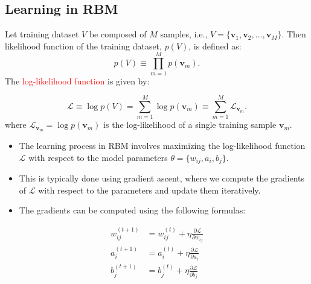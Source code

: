 \documentclass[10pt, a4paper]{article}
\begin{document}
\subsection{Learning in RBM}

Let training dataset $V$ be composed of $M$ samples,
i.e., $V = \{\mathbf{v}_{1}, \mathbf{v}_{2}, \ldots, \mathbf{v}_{M}\}$.
Then likelihood function of the training dataset, $p(V)$, is defined as:
\begin{equation}
  \label{eq:likelihood}
  p(V) \equiv \prod_{m=1}^{M} p(\mathbf{v}_m).
\end{equation}
The \textcolor{red}{log-likelihood function} is given by:
\begin{checkpointbox}
\begin{equation}
  \label{eq:log_likelihood}
  \mathcal{L} \equiv \log p(V) = \sum_{m=1}^{M} \log p(\mathbf{v}_m)
  \equiv \sum_{m=1}^{M} \mathcal{L}_{\mathbf{v}_m}.
\end{equation}
where $\mathcal{L}_{\mathbf{v}_m} = \log p(\mathbf{v}_m)$ is the log-likelihood of a single
training sample $\mathbf{v}_m$.
\end{checkpointbox}

\begin{itemize}
  \item The learning process in RBM involves maximizing the log-likelihood
    function $\mathcal{L}$ with respect to the model parameters $\theta = \{w_{ij}, a_i, b_j\}$.
  \item This is typically done using gradient ascent, where we compute
    the gradients of $\mathcal{L}$ with respect to the parameters and update them iteratively.
  \item The gradients can be computed using the following formulas:
\end{itemize}

\begin{cautionbox}
  \begin{align}
    w_{ij}^{(t+1)} &= w_{ij}^{(t)} + \eta \frac{\partial \mathcal{L}}{\partial w_{ij}} \label{eq:update_w} \\
    a_i^{(t+1)} &= a_i^{(t)} + \eta \frac{\partial \mathcal{L}}{\partial a_i} \label{eq:update_a} \\
    b_j^{(t+1)} &= b_j^{(t)} + \eta \frac{\partial \mathcal{L}}{\partial b_j} \label{eq:update_b}
  \end{align}
\end{cautionbox}
\end{document}
